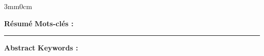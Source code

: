 

\thispagestyle{backcover}

\begin{changemargin}{3mm}{0cm}
    \begin{minipage}[c]{0.96\columnwidth}
        
        {\LARGE\textbf{R\'esum\'e}}
        \vskip2mm
            \begingroup
                \normalsize
                \@frenchAbstract
            \endgroup
        \vskip3mm
        {\textbf{Mots-cl\'es : }
            \begingroup
                \@frenchAbstractKeywords
            \endgroup
        }
        
        \vskip12mm
        \hrule
        \vskip10mm
        
        {\LARGE\textbf{Abstract}}
        \vskip2mm
            \begingroup
                \normalsize
                \@englishAbstract
            \endgroup
        \vskip3mm
        {\textbf{Keywords : }
            \begingroup
                \@englishAbstractKeywords
            \endgroup
        }
    \end{minipage}
\end{changemargin}